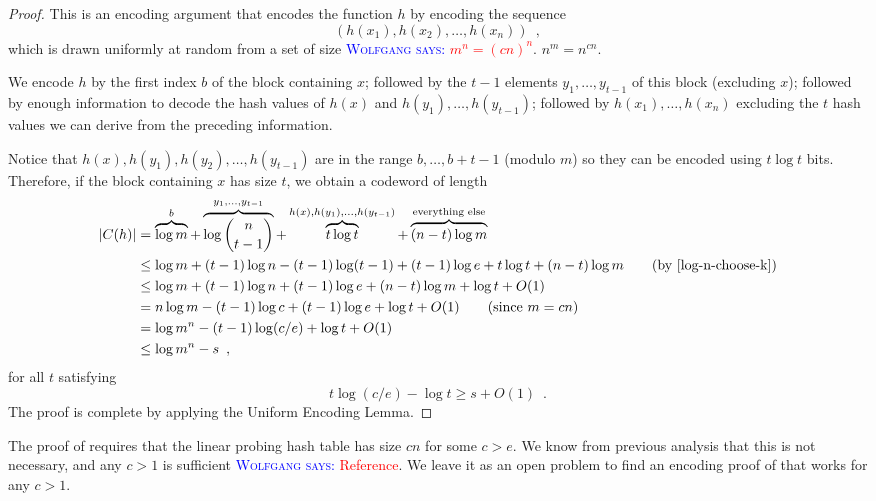 \documentclass{patmorin}
\newcommand{\aremark}[3]{\textcolor{blue}{\textsc{#1 #2:}}
  \textcolor{red}{\textsf{#3}}}
\newcommand{\wolfgang}[2][says]{\aremark{Wolfgang}{#1}{#2}}
\begin{document}
\begin{proof}
  This is an encoding argument that encodes the function $h$ by
  encoding the sequence
  \[
    (h(x_1),h(x_2),\ldots,h(x_n)) \enspace ,
  \]
  which is drawn uniformly at random from a set of size
  \wolfgang{$m^n = (cn)^n$}.
  $n^{m}=n^{cn}$.
  
  We encode $h$ by the first index $b$ of the block containing $x$;
  followed by the $t-1$ elements $y_1,\ldots,y_{t-1}$ of this block
  (excluding $x$); followed by enough information to decode the hash
  values of $h(x)$ and $h(y_1),\ldots,h(y_{t-1})$; followed by
  $h(x_1),\ldots,h(x_n)$ excluding the $t$ hash values we can derive
  from the preceding information.

  Notice that $h(x),h(y_1),h(y_2),\ldots,h(y_{t-1})$ are in the range
  $b,\ldots,b+t-1$ (modulo $m$) so they can be encoded using
  $t\log t$ bits.  Therefore, if the block containing $x$ has size
  $t$, we obtain a codeword of length 
  \begin{align*}
    |C(h)| & = \overbrace{\log m}^{b} + \overbrace{\log\binom{n}{t-1}}^{y_1,\ldots,y_{t-1}} + \overbrace{t\log t}^{h(x),h(y_1),\ldots,h(y_{t-1})} + \overbrace{(n-t)\log m}^{\text{everything else}} \\
           & \le \log m + (t-1)\log n - 
             (t-1)\log(t-1) + (t-1)\log e + t\log t + (n-t)\log m \tag{by \eqref{log-n-choose-k}}\\
           & \le \log m + (t-1)\log n + (t-1)\log e + (n-t)\log m + \log t+ O(1)\\
           & = n\log m - (t-1)\log c + (t-1)\log e + \log t + O(1) \tag{since $m = cn$}\\
           & = \log m^n - (t-1)\log(c/e) + \log t + O(1) \\
           & \le \log m^n - s \enspace ,
  \end{align*}
  for all $t$ satisfying
  \[
    t \log (c/e) - \log t \ge s + O(1) \enspace .
  \]
  The proof is complete by applying the Uniform Encoding Lemma.
\end{proof}

\begin{rem}
  The proof of  requires that the linear
  probing hash table has size $cn$ for some $c>e$.  We know from
  previous analysis that this is not necessary, and any $c>1$ is
  sufficient \wolfgang{Reference}. 
  We leave it as an open problem to find an encoding proof
  of  that works for any $c>1$.
\end{rem}
\end{document}
